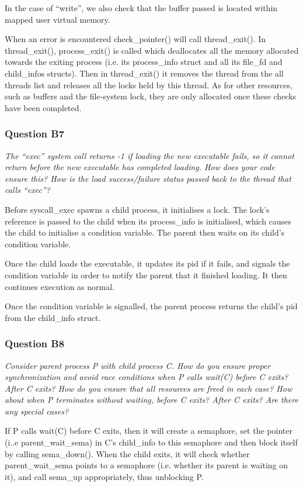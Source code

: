 In the case of ``write'', we also check that the buffer passed is located within mapped user virtual memory.

When an error is encountered check\_pointer() will call thread\_exit(). In thread\_exit(), process\_exit() is called which deallocates all the memory allocated towards the exiting process (i.e. its process\_info struct and all its file\_fd and child\_infos structs).
Then in thread\_exit() it removes the thread from the all threads list and releases all the locks held by this thread.
As for other resources, such as buffers and the file-system lock, they are only allocated once these checks have been completed.

\subsubsection*{Question B7} %
\textit{The ``exec'' system call returns -1 if loading the new executable fails, so it cannot return before the new executable has completed loading.  How does your code ensure this?  How is the load success/failure status passed back to the thread that calls ``exec''?}

Before syscall\_exec spawns a child process, it initialises a lock. The lock's reference is passed to the child when its process\_info is initialised, which causes the child to initialise a condition variable. The parent then waits on its child's condition variable.

Once the child loads the executable, it updates its pid if it fails, and signals the condition variable in order to notify the parent that it finished loading. It then continues execution as normal.

Once the condition variable is signalled, the parent process returns the child's pid from the child\_info struct.

\subsubsection*{Question B8} %
\textit{Consider parent process P with child process C.  How do you ensure proper synchronization and avoid race conditions when P calls wait(C) before C exits?  After C exits?  How do you ensure that all resources are freed in each case?  How about when P terminates without waiting, before C exits?  After C exits?  Are there any special cases?}

If P calls wait(C) before C exits, then it will create a semaphore, set the pointer (i..e parent\_wait\_sema) in C's child\_info to this semaphore and then block itself by calling sema\_down(). When the child exits, it will check whether parent\_wait\_sema points to a semaphore (i.e. whether its parent is waiting on it), and call sema\_up appropriately, thus unblocking P.

